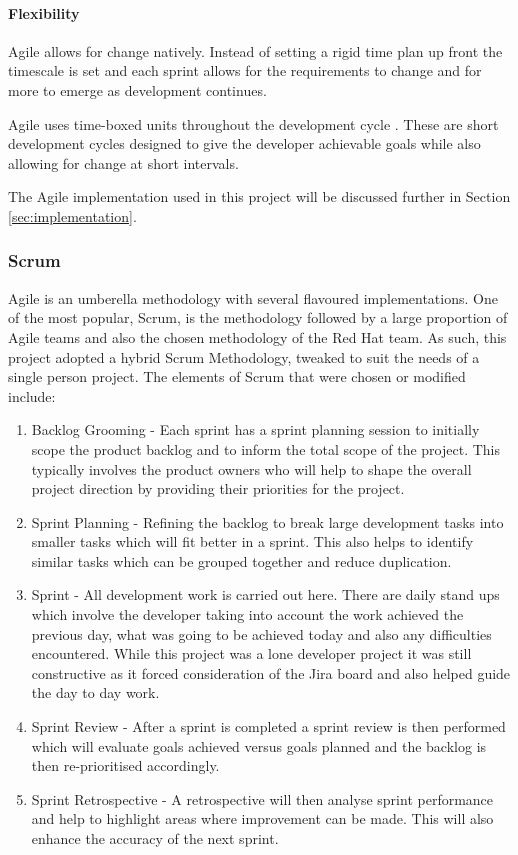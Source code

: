 \paragraph{Flexibility} Agile allows for change natively. Instead of setting a rigid time plan up front the timescale is set and each \gls{sprint} allows for the requirements to change and for more to emerge as development continues.

Agile uses time-boxed units throughout the development cycle \citep{Agile2016}. These are short development cycles designed to give the developer achievable goals while also allowing for change at short intervals.

The Agile implementation used in this project will be discussed further in Section \ref{sec:implementation}.

\subsubsection{Scrum}
Agile is an umberella methodology with several flavoured implementations. One of the most popular, \gls{Scrum}, is the methodology followed by a large proportion of Agile teams and also the chosen methodology of the Red Hat team. As such, this project adopted a hybrid \gls{Scrum} Methodology, tweaked to suit the needs of a single person project. The elements of Scrum that were chosen or modified include:

\begin{enumerate}
	\item Backlog Grooming - Each \gls{sprint} has a \gls{sprint} planning session to initially scope the product \gls{backlog} and to inform the total scope of the project. This typically involves the product owners who will help to shape the overall project direction by providing their priorities for the project.
	\item Sprint Planning - Refining the \gls{backlog} to break large development tasks into smaller tasks which will fit better in a \gls{sprint}. This also helps to identify similar tasks which can be grouped together and reduce duplication.
	\item Sprint - All development work is carried out here. There are daily stand ups which involve the developer taking into account the work achieved the previous day, what was going to be achieved today and also any difficulties encountered. While this project was a lone developer project it was still constructive as it forced consideration of the Jira board and also helped guide the day to day work.
	\item Sprint Review - After a \gls{sprint} is completed a \gls{sprint} review is then performed which will evaluate goals achieved versus goals planned and the \gls{backlog} is then re-prioritised accordingly.
	\item Sprint Retrospective - A retrospective will then analyse \gls{sprint} performance and help to highlight areas where improvement can be made. This will also enhance the accuracy of the next \gls{sprint}.
\end{enumerate}

